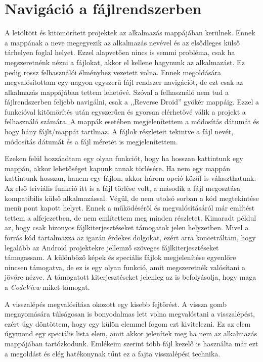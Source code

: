 \documentclass{thesis-ekf}
\theoremstyle{definition}
\theoremstyle{remark}
\begin{document}
\section{Navigáció a fájlrendszerben}

A letöltött és kitömörített projektek az alkalmazás mappájában kerülnek.
Ennek a mappának a neve megegyezik az alkalmazás nevével és az elsődleges külső tárhelyen foglal helyet.
Ezzel alapvetően nincs is semmi probléma, csak ha megszeretnénk nézni a fájlokat, akkor el kellene hagynunk az alkalmazást.
Ez pedig rossz felhasználói élményhez vezetett volna.
Ennek megoldására megvalósítottam egy nagyon egyszerű fájl rendszer navigációt, de ezt csak az alkalmazás mappájában tettem lehetővé.
Szóval a felhasználó nem tud a fájlrendszerben feljebb navigálni, csak a ,,Reverse Droid'' gyökér mappáig.
Ezzel a funkcióval kitömörítés után egyszerűen és gyorsan elérhetővé válik a projekt a felhasználó számára.
A mappák esetében megjelenítettem a módosítás dátumát és hogy hány fájlt/mappát tartlmaz.
A fájlok részleteit tekintve a fájl nevét, módosítás dátumát és a fájl méretét is megjelenítettem.

Ezeken felül hozzáadtam egy olyan funkciót, hogy ha hosszan kattintunk egy mappán, akkor lehetőséget kapunk annak törlésére.
Ha nem egy mappán kattintunk hosszan, hanem egy fájlon, akkor három opció közül is választhatunk.
Az első triviális funkció itt is a fájl törlése volt, a második a fájl megosztása kompatibilis külső alkalmazással.
Végül, de nem utolsó sorban a kód megtekintése menü pont kapott helyet.
Ennek a működéséről és megvalósításáról már említést tettem a  alfejezetben, de nem említettem meg minden részletet.
Kimaradt példul az, hogy csak bizonyos fájlkiterjesztéseket támogatok jelen helyzetben.
Mivel a forrás kód tartalmazza az igazán érdekes dolgokat, ezért arra koncetráltam, hogy legalább az Android projektekre jellemző szöveges fájlkiterjesztéseket támogassam.
A különböző képek és speciális fájlok megjelenítése egyenlőre nincsen támogatva, de ez is egy olyan funkció, amit megszeretnék valósítani a jövőre nézve.
A támogatott kiterjesztéseket jelenleg az is befolyásolja, hogy maga a \emph{CodeView} miket támogat.

A visszalépés megvalósítása okozott egy kisebb fejtörést.
A vissza gomb megnyomására túlságosan is bonyodalmas lett volna megvalóstani a visszalépést, ezért úgy döntöttem, hogy egy külön elemmel fogom ezt kivitelezni.
Ez az elem úgymond egy speciális lista elem, amit akkor jelenítek meg ha nem az alkalmazás mappájában tartózkodunk.
Emlékeim szerint több fájl kezelő is használta már ezt a megoldást és elég hatékonynak tűnt ez a fajta visszalépési technika.
\end{document}
